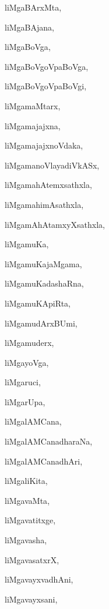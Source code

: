 \begin{multicols}{2}
{liMgaBArxMta}, \pageref{liMgaBArxMta}

{liMgaBAjana}, \pageref{liMgaBAjana}

{liMgaBoVga}, \pageref{liMgaBoVga}

{liMgaBoVgoVpaBoVga}, \pageref{liMgaBoVgoVpaBoVga}

{liMgaBoVgoVpaBoVgi}, \pageref{liMgaBoVgoVpaBoVgi}

{liMgamaMtarx}, \pageref{liMgamaMtarx}

{liMgamajajxna}, \pageref{liMgamajajxna}

{liMgamajajxnoVdaka}, \pageref{liMgamajajxnoVdaka}

{liMgamanoVlayadiVkASx}, \pageref{liMgamanoVlayadiVkASx}

{liMgamahAtemxsathxla}, \pageref{liMgamahAtemxsathxla}

{liMgamahimAsathxla}, \pageref{liMgamahimAsathxla}

{liMgamAhAtamxyXsathxla}, \pageref{liMgamAhAtamxyXsathxla}

{liMgamuKa}, \pageref{liMgamuKa}

{liMgamuKajaMgama}, \pageref{liMgamuKajaMgama}

{liMgamuKadashaRna}, \pageref{liMgamuKadashaRna}

{liMgamuKApiRta}, \pageref{liMgamuKApiRta}

{liMgamudArxBUmi}, \pageref{liMgamudArxBUmi}

{liMgamuderx}, \pageref{liMgamuderx}

{liMgayoVga}, \pageref{liMgayoVga}

{liMgaruci}, \pageref{liMgaruci}

{liMgarUpa}, \pageref{liMgarUpa}

{liMgalAMCana}, \pageref{liMgalAMCana}

{liMgalAMCanadharaNa}, \pageref{liMgalAMCanadharaNa}

{liMgalAMCanadhAri}, \pageref{liMgalAMCanadhAri}

{liMgaliKita}, \pageref{liMgaliKita}

{liMgavaMta}, \pageref{liMgavaMta}

{liMgavatitxge}, \pageref{liMgavatitxge}

{liMgavasha}, \pageref{liMgavasha}

{liMgavasatxrX}, \pageref{liMgavasatxrX}

{liMgavayxvadhAni}, \pageref{liMgavayxvadhAni}

{liMgavayxsani}, \pageref{liMgavayxsani}


\end{multicols}
